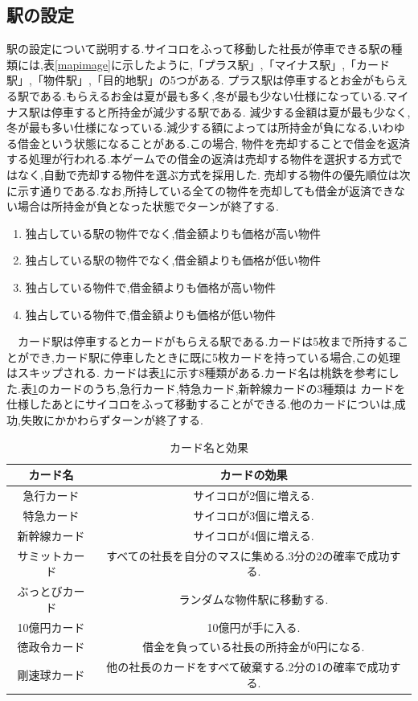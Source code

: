 \documentclass[a4j]{jarticle}
\begin{document}
    \subsection{駅の設定}
    駅の設定について説明する.サイコロをふって移動した社長が停車できる駅の種類には,表\ref{mapimage}に示したように,「プラス駅」,「マイナス駅」,「カード駅」,「物件駅」,「目的地駅」の5つがある.
    プラス駅は停車するとお金がもらえる駅である.もらえるお金は夏が最も多く,冬が最も少ない仕様になっている.マイナス駅は停車すると所持金が減少する駅である.
    減少する金額は夏が最も少なく,冬が最も多い仕様になっている.減少する額によっては所持金が負になる,いわゆる借金という状態になることがある.この場合,
    物件を売却することで借金を返済する処理が行われる.本ゲームでの借金の返済は売却する物件を選択する方式ではなく,自動で売却する物件を選ぶ方式を採用した.
    売却する物件の優先順位は次に示す通りである.なお,所持している全ての物件を売却しても借金が返済できない場合は所持金が負となった状態でターンが終了する.
    \begin{enumerate}
        \item 独占している駅の物件でなく,借金額よりも価格が高い物件
        \item 独占している駅の物件でなく,借金額よりも価格が低い物件
        \item 独占している物件で,借金額よりも価格が高い物件
        \item 独占している物件で,借金額よりも価格が低い物件
    \end{enumerate}
    　カード駅は停車するとカードがもらえる駅である.カードは5枚まで所持することができ,カード駅に停車したときに既に5枚カードを持っている場合,この処理はスキップされる.
    カードは表\ref{cardlist}に示す8種類がある.カード名は桃鉄を参考にした.表\ref{cardlist}のカードのうち,急行カード,特急カード,新幹線カードの3種類は
    カードを仕様したあとにサイコロをふって移動することができる.他のカードについは,成功,失敗にかかわらずターンが終了する.
    \begin{table}[H]
        \caption{カード名と効果}
      \label{cardlist}
      \begin{center}
          \begin{tabular}{c|c}\hline
              カード名 & カードの効果 \\ \hline \hline
              急行カード & サイコロが2個に増える.\\
              特急カード & サイコロが3個に増える.\\
              新幹線カード & サイコロが4個に増える.\\
              サミットカード & すべての社長を自分のマスに集める.3分の2の確率で成功する.\\
              ぶっとびカード & ランダムな物件駅に移動する. \\
              10億円カード & 10億円が手に入る.\\
              徳政令カード & 借金を負っている社長の所持金が0円になる.\\
              剛速球カード & 他の社長のカードをすべて破棄する.2分の1の確率で成功する.\\ \hline
          \end{tabular}
      \end{center}
      \end{table}
\end{document}
